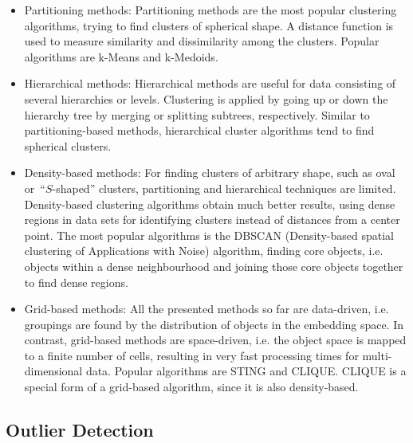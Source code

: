 \begin{itemize} 
\item Partitioning methods: Partitioning methods are the most popular clustering algorithms, trying to find clusters of spherical shape. A distance function is used to measure similarity and dissimilarity among the clusters. Popular algorithms are k-Means and k-Medoids. 
\item Hierarchical methods: Hierarchical methods are useful for data consisting of several hierarchies or levels. Clustering is applied by going up or down the hierarchy tree by merging or splitting subtrees, respectively. Similar to partitioning-based methods, hierarchical cluster algorithms tend to find spherical clusters. 
\item Density-based methods: For finding clusters of arbitrary shape, such as oval or~\enquote{$S$-shaped} clusters, partitioning and hierarchical techniques are limited. Density-based clustering algorithms obtain much better results, using dense regions in data sets for identifying clusters instead of distances from a center point. The most popular algorithms is the DBSCAN (Density-based spatial clustering of Applications with Noise) algorithm, finding core objects, i.e. objects within a dense neighbourhood and joining those core objects together to find dense regions.
\item Grid-based methods: All the presented methods so far are data-driven, i.e. groupings are found by the distribution of objects in the embedding space. In contrast, grid-based methods are space-driven, i.e. the object space is mapped to a finite number of cells, resulting in very fast processing times for multi-dimensional data. Popular algorithms are STING and CLIQUE. CLIQUE is a special form of a grid-based algorithm, since it is also density-based.
\end{itemize}





\subsection{Outlier Detection}

